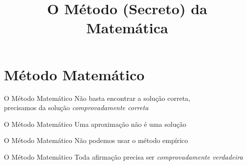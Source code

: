 
\usepackage{calculo_varias_variaveis-1}

\title{O Método (Secreto) da Matemática}



\addtitle

\section{Método Matemático}

\begin{frame}{O Método Matemático}
  Não basta encontrar a solução correta, \\[2mm]
  precisamos da solução \emph{comprovadamente correta}
\end{frame}

\begin{frame}{O Método Matemático}
  Uma aproximação não é uma solução
\end{frame}

\begin{frame}{O Método Matemático}
  Não podemos usar o método empírico
\end{frame}

\begin{frame}{O Método Matemático}
  Toda afirmação precisa ser \emph{comprovadamente verdadeira}
\end{frame}

